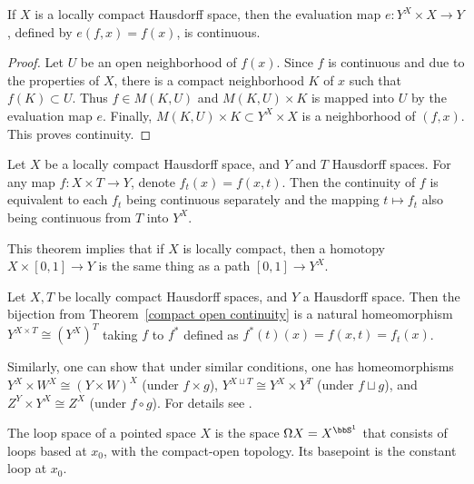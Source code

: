 \begin{prop}
    If $X$ is a locally compact Hausdorff space, then the evaluation map $e:Y^X\times X\to Y$, defined by $e(f,x)=f(x)$, is continuous.
\end{prop}
\begin{proof}
    Let $U$ be an open neighborhood of $f(x)$. Since $f$ is continuous and due to the properties of $X$, there is a compact neighborhood $K$ of $x$ such that $f(K)\subset U$. Thus $f\in M(K,U)$ and $M(K,U)\times K$ is mapped into $U$ by the evaluation map $e$. Finally, $M(K,U)\times K \subset Y^X\times X$ is a neighborhood of $(f,x)$. This proves continuity.
\end{proof}


\begin{thm}\label{compact open continuity}
    Let $X$ be a locally compact Hausdorff space, and $Y$ and $T$ Hausdorff spaces. For any map $f:X\times T\to Y$, denote $f_t(x)=f(x,t)$. Then the continuity of $f$ is equivalent to each $f_t$ being continuous separately and the mapping $t\mapsto f_t$ also being continuous from $T$ into $Y^X$. 
\end{thm}

This theorem implies that if $X$ is locally compact, then a homotopy $X\times [0,1]\to Y$ is the same thing as a path $[0,1]\to Y^X$.
\begin{cor}
    Let $X,T$ be locally compact Hausdorff spaces, and $Y$ a Hausdorff space. Then the bijection from Theorem~\ref{compact open continuity} is a natural homeomorphism $Y^{X\times T}\cong \left(Y^X\right)^T$ taking $f$ to $f^\ast$ defined as $f^\ast (t)(x)=f(x,t)=f_t(x)$.
\end{cor}

Similarly, one can show that under similar conditions, one has homeomorphisms $Y^X\times W^X\cong (Y\times W)^X$ (under $f\times g$), $Y^{X\sqcup T}\cong Y^X\times Y^T$ (under $f\sqcup g$), and $Z^Y\times Y^X \cong Z^X$ (under $f\circ g$). For details see \cite[\S VII.2]{Bredon}.
\begin{defn}
    The loop space of a pointed space $X$ is the space $\Omega X=X^{\bbS^1}$ that consists of loops based at $x_0$, with the compact-open topology. Its basepoint is the constant loop at $x_0$.
\end{defn}


